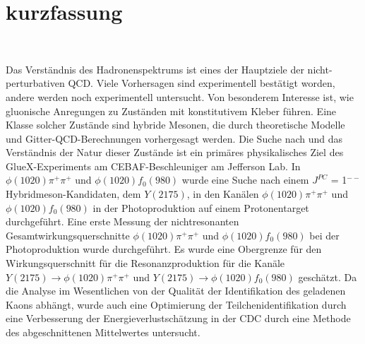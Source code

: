 \section*{kurzfassung}

~\par Das Verst\"andnis des Hadronenspektrums ist eines der Hauptziele der nicht-perturbativen QCD. Viele Vorhersagen sind experimentell best\"atigt worden, andere werden noch experimentell untersucht. Von besonderem Interesse ist, wie gluonische Anregungen zu Zust\"anden mit konstitutivem Kleber f\"uhren.  Eine Klasse solcher Zust\"ande sind hybride Mesonen, die durch theoretische Modelle und Gitter-QCD-Berechnungen vorhergesagt werden. Die Suche nach und das Verst\"andnis der Natur dieser Zust\"ande ist ein prim\"ares physikalisches Ziel des GlueX-Experiments am CEBAF-Beschleuniger am Jefferson Lab. In $\phi(1020)\pi^{+}\pi^{+}$ und $\phi(1020)f_{0}(980)$ wurde eine Suche nach einem $J^{PC}$ = 1$^{--}$ Hybridmeson-Kandidaten, dem $Y(2175)$, in den Kan\"alen $\phi(1020)\pi^{+}\pi^{+}$ und $\phi(1020)f_{0}(980)$ in der Photoproduktion auf einem Protonentarget durchgef\"uhrt. Eine erste Messung der nichtresonanten Gesamtwirkungsquerschnitte $\phi(1020)\pi^{+}\pi^{+}$ und $\phi(1020)f_{0}(980)$ bei der Photoproduktion wurde durchgef\"uhrt.  Es wurde eine Obergrenze f\"ur den Wirkungsquerschnitt f\"ur die Resonanzproduktion f\"ur die Kan\"ale $Y(2175) \rightarrow \phi(1020)\pi^{+}\pi^{+}$ und $Y(2175) \rightarrow \phi(1020)f_0(980)$ gesch\"atzt. Da die Analyse im Wesentlichen von der Qualit\"at der Identifikation des geladenen Kaons abh\"angt, wurde auch eine Optimierung der Teilchenidentifikation durch eine Verbesserung der Energieverlustsch\"atzung in der CDC durch eine Methode des abgeschnittenen Mittelwertes untersucht.
